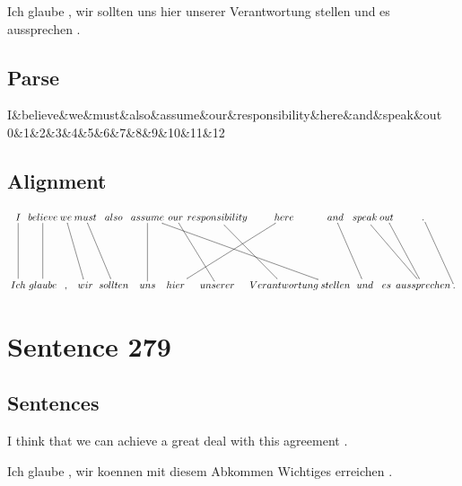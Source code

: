 \documentclass{report}
\begin{document}
\noindent Ich glaube , wir sollten uns hier unserer Verantwortung stellen und es aussprechen .



\subsection*{Parse}
\begin{dependency}[theme=simple]
\begin{deptext}[column sep=.5cm, row sep=.1ex]
I\&believe\&we\&must\&also\&assume\&our\&responsibility\&here\&and\&speak\&out\\
0\&1\&2\&3\&4\&5\&6\&7\&8\&9\&10\&11\&12\\
\end{deptext}
\end{dependency}


\subsection*{Alignment}
\scriptsize{
$
\xymatrix@C-2.3pc{
I \ar @{-} [dd] & believe \ar @{-} [dd] & we \ar @{-} [ddr] & must \ar @{-} [ddr] & also & assume \ar @{-} [ddrrrr] \ar @{-} [dd] & our \ar @{-} [ddr] & responsibility \ar @{-} [ddr] & here \ar @{-} [ddll] & and \ar @{-} [ddr] & speak \ar @{-} [ddrr] & out \ar @{-} [ddr] & . \ar @{-} [ddr]\\\\
Ich & glaube & , & wir & sollten & uns & hier & unserer & Verantwortung & stellen & und & es & aussprechen & .
}$}
\newpage\section*{Sentence 279}

\subsection*{Sentences}
I think that we can achieve a great deal with this agreement .

\noindent Ich glaube , wir koennen mit diesem Abkommen Wichtiges erreichen .
\end{document}
